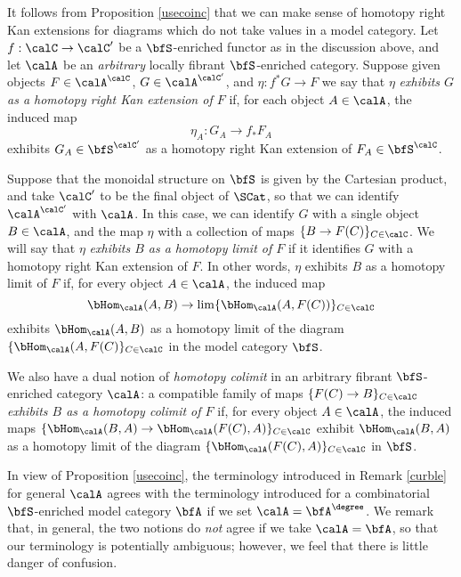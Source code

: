 \begin{remark}\label{curble}
It follows from Proposition \ref{usecoinc} that we can make sense of homotopy right Kan extensions for diagrams
which do not take values in a model category. 
Let $f: \calC \rightarrow \calC'$ be a $\bfS$-enriched functor as in the discussion above, and let $\calA$ be an {\em arbitrary} locally fibrant $\bfS$-enriched category. Suppose given objects $F \in \calA^{\calC}$, $G \in \calA^{\calC'}$, and $\eta: f^{\ast} G \rightarrow F$
we say that $\eta$ {\it exhibits $G$ as a homotopy right
Kan extension of $F$} if, for each object $A \in \calA$, the induced map
$$\eta_A: G_A \rightarrow f_{\ast} F_A$$ exhibits $G_A \in \bfS^{\calC'}$ as a homotopy right Kan extension of $F_A \in \bfS^{\calC}$.

Suppose that the monoidal structure on $\bfS$ is given by the Cartesian product, and take
$\calC'$ to be the final object of $\SCat$, so that we can identify $\calA^{\calC'}$ with $\calA$.
In this case, we can identify $G$ with a single object $B \in \calA$, and the map $\eta$ with
a collection of maps $ \{ B \rightarrow F(C) \}_{C \in \calC}$. We will say that $\eta$ 
{\it exhibits $B$ as a homotopy limit of $F$} if it identifies $G$ with a homotopy right Kan extension of $F$. In other words, $\eta$ exhibits $B$ as a homotopy limit of $F$ if, for every object
$A \in \calA$, the induced map
$$ \bHom_{\calA}(A,B) \rightarrow \lim \{ \bHom_{\calA}(A, F(C)) \}_{C \in \calC}$$
exhibits $\bHom_{\calA}(A,B)$ as a homotopy limit of the diagram
$\{ \bHom_{\calA}(A, F(C) \}_{C \in \calC}$ in the model category $\bfS$.

We also have a dual notion of {\em homotopy colimit} in an arbitrary fibrant
$\bfS$-enriched category $\calA$: a compatible family of maps $\{ F(C) \rightarrow B \}_{C \in \calC}$ {\it exhibits $B$ as a homotopy colimit of $F$} if, for every object $A \in \calA$, the
induced maps $\{ \bHom_{\calA}( B, A) \rightarrow \bHom_{\calA}( F(C), A) \}_{C \in \calC}$
exhibit $\bHom_{\calA}(B,A)$ as a homotopy limit of the diagram
$\{ \bHom_{\calA}( F(C), A) \}_{C \in \calC}$ in $\bfS$. 
\end{remark}

\begin{remark}
In view of Proposition \ref{usecoinc}, the terminology introduced in Remark \ref{curble} for general $\calA$ agrees with the terminology introduced for a combinatorial $\bfS$-enriched model category $\bfA$ if we set $\calA = \bfA^{\degree}$. We remark that, in general, the two notions do {\em not} agree if
we take $\calA = \bfA$, so that our terminology is potentially ambiguous; however, we feel that there is little danger of confusion.
\end{remark}

